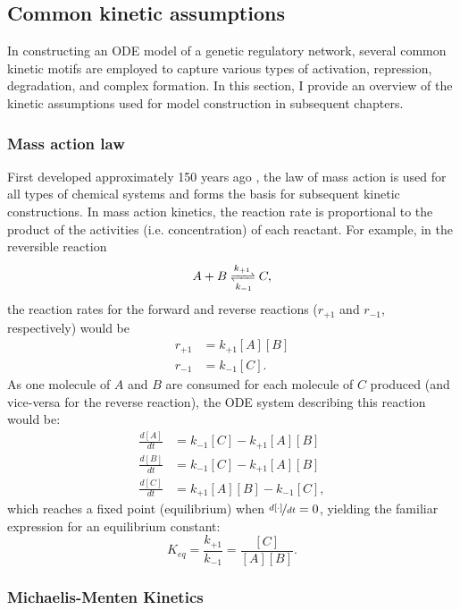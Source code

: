 \subsection{Common kinetic assumptions}\label{sec:kinetic}

In constructing an ODE model of a genetic regulatory network, several common kinetic motifs are employed to capture various types of activation, repression, degradation, and complex formation.
In this section, I provide an overview of the kinetic assumptions used for model construction in subsequent chapters.

\subsubsection{Mass action law}

First developed approximately 150 years ago \cite{Voit2015}, the law of mass action is used for all types of chemical systems and forms the basis for subsequent kinetic constructions. 
In mass action kinetics, the reaction rate is proportional to the product of the activities (i.e. concentration) of each reactant.
For example, in the reversible reaction
\[
  A + B \xrightleftharpoons[k_{-1}]{k_{+1}} C,
\]
the reaction rates for the forward and reverse reactions ($r_{+1}$ and $r_{-1}$, respectively) would be
\begin{align*}
  r_{+1} &= k_{+1}[A][B]\\
  r_{-1} &= k_{-1}[C].
\end{align*}
As one molecule of $A$ and $B$ are consumed for each molecule of $C$ produced (and vice-versa for the reverse reaction), the ODE system describing this reaction would be:
\begin{align*}
  \frac{d[A]}{dt} &= k_{-1}[C] - k_{+1}[A][B]\\
  \frac{d[B]}{dt} &= k_{-1}[C] - k_{+1}[A][B]\\
  \frac{d[C]}{dt} &= k_{+1}[A][B] - k_{-1}[C],
\end{align*}
which reaches a fixed point (equilibrium) when $\nicefrac{d[\cdot]}{dt} = 0$, yielding the familiar expression for an equilibrium constant:
\[
  K_{eq} = \frac{k_{+1}}{k_{-1}} = \frac{[C]}{[A][B]}.
\]

\subsubsection{Michaelis-Menten Kinetics}\label{sec:mmenten}

